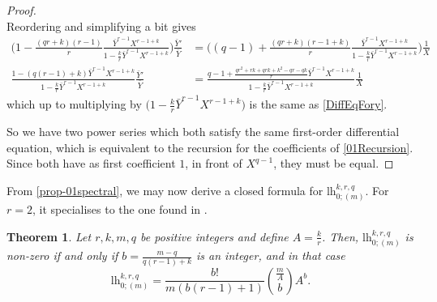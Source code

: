 \documentclass[10pt,a4paper,oneside,no-math,reqno]{amsart}%
\theoremstyle{plain}
\newtheorem{theorem}{Theorem}[section]
\theoremstyle{definition}
\theoremstyle{remark}
\numberwithin{equation}{section}
\newcommand{\1}{\mathds{1}}
\newcommand{\<}{\langle}
\renewcommand{\>}{\rangle}
\newcommand{\lh}{\mathord{\mathrm{l\!h}}}
\begin{document}
\begin{proof}
\begin{equation}
	\end{equation}
	Reordering and simplifying a bit gives
	\begin{align}
		\Big( 1 - \frac{(qr+k)(r-1)}{r} \frac{\bar{Y}^{r-1} X^{r-1+k} }{ 1 - \frac{k}{r} \bar{Y}^{r-1} X^{r-1+k} } \Big) \frac{\bar{Y}'}{\bar{Y}} 
		&=
		\Big( (q-1) + \frac{(qr+k)(r-1+k)}{r} \frac{\bar{Y}^{r-1} X^{r-1+k} }{ 1 - \frac{k}{r} \bar{Y}^{r-1} X^{r-1+k} } \Big) \frac{1}{X}
		\\
		\frac{ 1 -(q(r-1) +k ) \bar{Y}^{r-1} X^{r-1+k} }{ 1 - \frac{k}{r} \bar{Y}^{r-1} X^{r-1+k} } \frac{\bar{Y}'}{\bar{Y}} 
		&=
		\frac{ q-1 + \frac{qr^2+rk + qrk + k^2 -qr - qk}{r} \bar{Y}^{r-1} X^{r-1+k} }{ 1 - \frac{k}{r} \bar{Y}^{r-1} X^{r-1+k} } \frac{1}{X}
	\end{align}
	which up to multiplying by $ \big( 1 - \frac{k}{r} \bar{Y}^{r-1} X^{r-1+k} \big) $ is the same as \eqref{DiffEqFory}.\par
	So we have two power series which both satisfy the same first-order differential equation, which is equivalent to the recursion for the coefficients of \cref{01Recursion}. Since both have as first coefficient $ 1$, in front of $X^{q-1}$, they must be equal.
\end{proof}

From \cref{prop-01spectral}, we may now derive a closed formula for $\lh^{k,r,q}_{0;(m)}$. For $r=2$, it specialises to the one found in \cite[Theorem 1]{CMS25}.

\begin{theorem}
    Let $r,k,m,q$ be positive integers and define $A=\frac{k}{r}$. Then, $ \lh^{k,r,q}_{0;(m)} $ is non-zero if and only if $b = \frac{m-q}{q(r-1)+k}$ is an integer, and in that case
    \begin{equation}
        \lh^{k,r,q}_{0;(m)}
        =
        \frac{b!}{m(b(r-1)+1)}\binom{\frac{m}{A}}{b}A^b.
    \end{equation}
\end{theorem}
\end{document}
